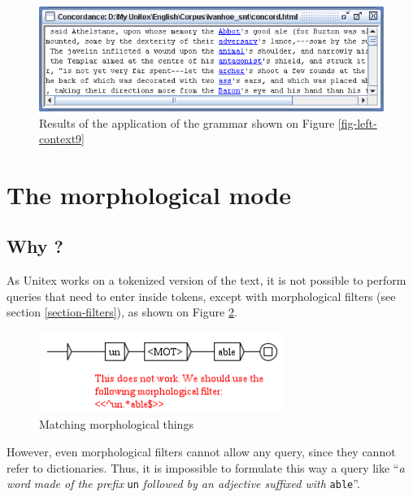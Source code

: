 \begin{figure}[!ht]
\begin{center}
\includegraphics[width=15cm]{resources/img/fig6-17j.png}
\caption{Results of the application of the grammar shown on Figure
\ref{fig-left-context9}\label{fig-left-context10}}
\end{center}
\end{figure}

\clearpage

\section{The morphological mode}
\label{section-morphological-mode}
\subsection{Why ?}
As Unitex works on a tokenized version of the text, it is not possible to
perform queries that need to enter inside tokens, except with morphological
filters (see section \ref{section-filters}), as shown on Figure
\ref{fig-morpho1}.

\begin{figure}[!ht]
\begin{center}
\includegraphics[width=8cm]{resources/img/fig6-17k.png}
\caption{Matching morphological things\label{fig-morpho1}}
\end{center}
\end{figure}

\bigskip
\noindent However, even morphological filters cannot allow any query, since they
cannot refer to dictionaries. Thus, it is impossible to formulate this way a
query like ``\textit{a word made of the prefix} \verb$un$ \textit{followed by an
adjective suffixed with} \verb+able+''.

